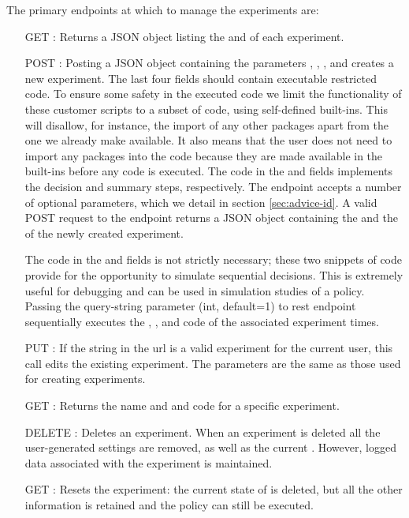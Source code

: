 \documentclass[nojss]{jss}
\begin{document}
The primary endpoints at which to manage the experiments are: 

\begin{itemize}
\item [GET] : Returns a JSON object listing the  and  of each experiment.
\item [POST] : Posting a JSON object containing the parameters , , ,  and  creates a new experiment. The last four fields should contain executable restricted  code. To ensure some safety in the executed code we limit the functionality of these customer scripts to a subset of  code, using self-defined built-ins. This will disallow, for instance, the import of any other packages apart from the one we already make available. It also means that the user does not need to import any packages into the code because they are made available in the built-ins before any code is executed. The code in the  and  fields implements the decision and summary steps, respectively. The  endpoint accepts a number of optional parameters, which we detail in section \ref{sec:advice-id}. A valid POST request to the  endpoint returns a JSON object containing the  and the  of the newly created experiment.

The code in the  and  fields is not strictly necessary; these two snippets of code provide for the opportunity to simulate sequential decisions. This is extremely useful for debugging and can be used in simulation studies of a policy. Passing the query-string parameter  (int, default=1) to rest endpoint  sequentially executes the , ,  and  code of the associated experiment  times.
\item [PUT] : If the  string in the url is a valid experiment for the current user, this call edits the existing experiment. The parameters are the same as those used for creating experiments.
\item [GET] : Returns the name and  and  code for a specific experiment.
\item [DELETE] : Deletes an experiment. When an experiment is deleted all the user-generated settings are removed, as well as the current . However, logged data associated with the experiment is maintained.
\item [GET] : Resets the experiment: the current state of  is deleted, but all the other information is retained and the policy can still be executed.
\end{itemize}
\end{document}

